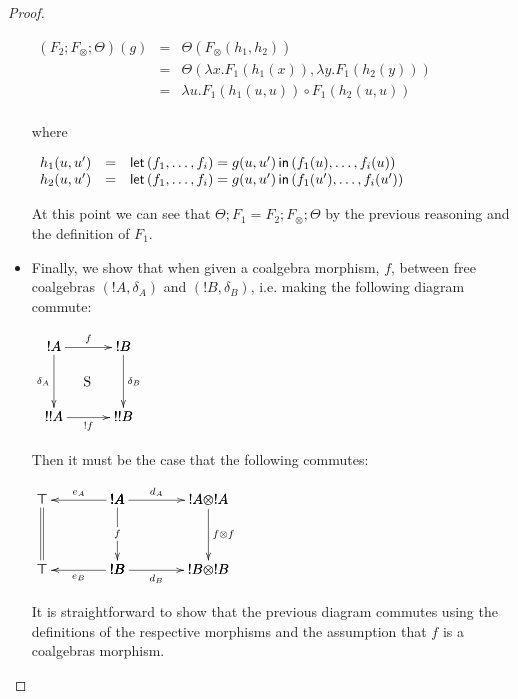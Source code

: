 \begin{proof}
\begin{report}
\begin{itemize}
    \begin{center}
      \begin{math}
        \begin{array}{lll}
          (F_2;F_\otimes;\Theta)(g)
          & = & \Theta(F_\otimes(h_1,h_2))\\
          & = & \Theta(\lambda x.F_1(h_1(x)), \lambda y.F_1(h_2(y)))\\
          & = & \lambda u.F_1(h_1(u,u)) \circ F_1(h_2(u,u))\\
        \end{array}
      \end{math}
    \end{center}
    where
    \begin{center}
      \begin{math}
        \begin{array}{lll}
          h_1(u,u') & = & \mathsf{let}\, (f_1,\ldots,f_i) = g(u,u') \,\mathsf{in}\, (f_1(u),\ldots,f_i(u))\\
          h_2(u,u') & = & \mathsf{let}\, (f_1,\ldots,f_i) = g(u,u') \,\mathsf{in}\, (f_1(u'),\ldots,f_i(u'))\\
        \end{array}        
      \end{math}
    \end{center}
    At this point we can see that $\Theta;F_1 = F_2;F_\otimes;\Theta$
    by the previous reasoning and the definition of $F_1$.

  \item Finally, we show that when given a coalgebra morphism, $f$,
    between free coalgebras $(!A,\delta_A)$ and $(!B,\delta_B)$,
    i.e. making the following diagram commute:
    \begin{center}
    \begin{math}
      \bfig
      \square/->`->`->`->/[!A`!B`!!A`!!B;f`\delta_A`\delta_B`!f]
      \place(240,250)[\text{S}]        
      \efig
    \end{math}
    \end{center}
    Then it must be the case that the following commutes:
    \begin{center}
      \begin{math}
        \bfig
        \hSquares/<-`->`=`->`->`<-`->/[\top`!A`!A \otimes !A`\top`!B`!B \otimes !B;e_A`d_A``f`f \otimes f`e_B`d_B]
        \efig                
      \end{math}
    \end{center}
    It is straightforward to show that the previous diagram commutes
    using the definitions of the respective morphisms and the 
    assumption that $f$ is a coalgebras morphism.
  \end{itemize}   
\end{report}
\end{proof}

